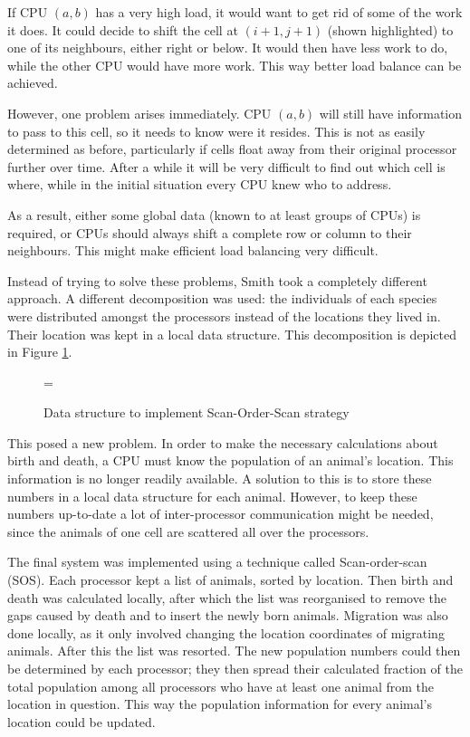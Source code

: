 If CPU $(a,b)$ has a very high load, it would want to get rid of some
of the work it does. It could decide to shift the cell at $(i+1, j+1)$
(shown highlighted) to one of its neighbours, either right
or below. It would then have less work to do, while the other CPU
would have more work. This way better load balance can be achieved.

However, one problem arises immediately. CPU $(a,b)$ will still have
information to pass to this cell, so it needs to know were it resides.
This is not as easily determined as before, particularly if cells
float away from their original processor further over time. After a while
it will be
very difficult to find out which cell is where, while in the
initial situation every CPU knew who to address.

As a result, either some global data (known to at least groups of CPUs) is
required, or CPUs should always shift a complete row or column to their
neighbours. This might make efficient load balancing very difficult.

Instead of trying to solve these problems, Smith took a completely different
approach. A different decomposition was used: the individuals
of each species were distributed amongst the processors instead of the
locations they lived in. Their location was kept in a local data
structure. This decomposition is depicted in Figure \ref{fSOS}.

\begin{figure}
\epsfxsize=\textwidth
{}
\caption{Data structure to implement Scan-Order-Scan strategy}
\label{fSOS}
\end{figure}

This posed a new problem. In order to make the necessary calculations
about birth and death, a CPU must know the population of an animal's
location. This information is no longer readily available. A solution
to this is to store these
numbers in a local data structure for each animal.
However, to keep these numbers
up-to-date a lot of inter-processor communication might be needed,
since the animals of one cell are scattered all over the processors.

The final system was implemented using a technique called
Scan-order-scan (SOS). Each processor kept a
list of animals, sorted by location. Then birth and death was calculated
locally, after which the list was reorganised to remove the gaps caused
by death and to insert the newly born animals. Migration was also done locally,
as it only involved changing the location coordinates of migrating animals.
After this the list
was resorted. The new population numbers could then be determined by each
processor; they then spread their calculated fraction of the total
population among all processors who have at least one animal from the
location in question. This way the population
information for every animal's location could be updated.

